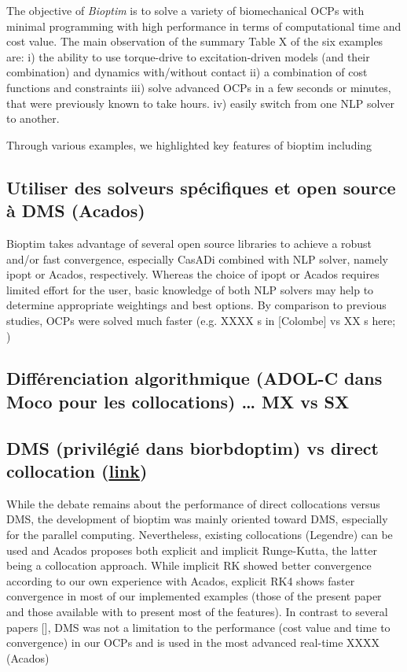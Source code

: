 The objective of \textit{Bioptim} is to solve a variety of biomechanical OCPs with minimal programming with high performance in terms of computational time and cost value. 
The main observation of the summary Table X of the six examples are: 
i) the ability to use torque-drive to excitation-driven models (and their combination) and dynamics with/without contact 
ii) a combination of cost functions and constraints 
iii) solve advanced OCPs in a few seconds or minutes, that were previously known to take hours. 
iv) easily switch from one NLP solver to another.


Through various examples, we highlighted key features of bioptim including 


\subsection{Utiliser des solveurs spécifiques et open source à DMS (Acados)}

Bioptim takes advantage of several open source libraries to achieve a robust and/or fast convergence, especially CasADi combined with NLP solver, namely ipopt or Acados, respectively. 
Whereas the choice of ipopt or Acados requires limited effort for the user, basic knowledge of both NLP solvers may help to determine appropriate weightings and best options. 
By comparison to previous studies, OCPs were solved much faster  (e.g. XXXX s in [Colombe] vs XX s here; )




\subsection{Différenciation algorithmique (ADOL-C dans Moco pour les collocations) … MX vs SX}



\subsection{DMS (privilégié dans biorbdoptim) vs direct collocation (\href{https://link.springer.com/chapter/10.1007/978-3-540-36119-0_4}{link})}


While the debate remains about the performance of direct collocations versus DMS, the development of bioptim was mainly oriented toward DMS, especially for the parallel computing. 
Nevertheless, existing collocations (Legendre)  can be used and Acados proposes both explicit and implicit Runge-Kutta, the latter being a collocation approach. 
While implicit RK showed better convergence according to our own experience with Acados, explicit RK4 shows faster convergence in most of our implemented examples (those of the present paper and those available with  to present most of the features). 
In contrast to several papers [\addref], DMS was not a limitation to the performance (cost value and time to convergence) in our OCPs and is used in the most advanced real-time XXXX (Acados)

